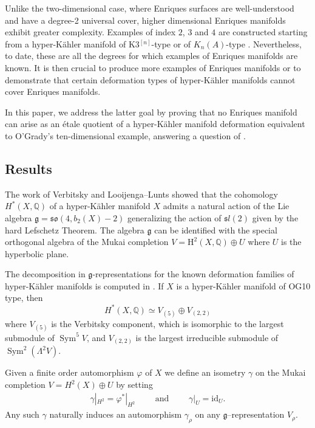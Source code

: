 \documentclass[a4paper,11pt]{amsart}
\newcommand{\bbQ}{{\mathbb Q}}
\newcommand{\mH}{{\mathrm H}}
\newcommand{\kg}{{\mathfrak g}}
\DeclareMathOperator{\Sym}{Sym}
\theoremstyle{plain}
\theoremstyle{remark}
\begin{document}
Unlike the two-dimensional case, where Enriques surfaces are well-understood and have a degree-2 universal cover, higher dimensional Enriques manifolds exhibit greater complexity. Examples of index \(2\), \(3\) and \(4\) are constructed starting from a hyper-Kähler manifold of K3\(^{[n]}\)-type or of \(K_n(A)\)-type \cite{BN-WS,OS}. 
 Nevertheless, to date, these are all the degrees for which examples of Enriques manifolds are known. It is then crucial to produce more examples of Enriques manifolds or to demonstrate that certain deformation types of hyper-Kähler manifolds cannot cover Enriques manifolds.

In this paper, we address the latter goal by proving that no Enriques manifold can arise as an étale quotient of a hyper-Kähler manifold deformation equivalent to O’Grady’s ten-dimensional example, answering a question of \cite{Pacienza_Sarti}.

\subsection{Results}
The work of Verbitsky \cite{Ver90,Ver95,Ver96} and Looijenga--Lunts \cite{LL97} showed that the cohomology $H^*(X,\mathbb Q)$ of a hyper-Kähler manifold $X$ admits a natural action of the Lie algebra $\mathfrak g=\mathfrak{so}(4,b_2(X)-2)$ generalizing the action of $\mathfrak sl(2)$ given by the hard Lefschetz Theorem. The algebra $\mathfrak g$ can be identified with the special orthogonal algebra of the Mukai completion $V=\mH^2(X,\bbQ)\oplus U$ where $U$ is the hyperbolic plane.

The decomposition in $\kg$-representations for the known deformation families of hyper-Kähler manifolds is computed in \cite{GKLR}. If $X$ is a hyper-Kähler manifold of OG10 type, then
\begin{equation}\label{tot-LLV-dec}
    H^*(X, \mathbb Q) \simeq V_{(5)}\oplus V_{(2,2)}
    \end{equation}
    where $V_{(5)}$ is the Verbitsky component, which is isomorphic to the largest submodule of $\Sym^5 V$, and $V_{(2,2)}$ is the largest irreducible submodule of $ \Sym^2(\Lambda^2V)$.

 Given a finite order automorphism $\varphi$ of \(X\) we define an isometry $\gamma$ on the Mukai completion $V = H^2(X)\oplus U$ by setting
 \begin{align*}
     \gamma|_{H^2} = \varphi^*|_{H^2}\qquad \mbox{ and  }\qquad \gamma|_U = \mathrm{id}_U.
 \end{align*}
Any such $\gamma$ naturally induces an automorphism $\gamma_{\rho}$ on any $\kg$--representation $V_\rho$.
\end{document}
